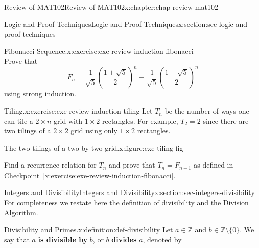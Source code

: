 \documentclass[oneside,10pt,]{book}
\newcommand{\xreffont}{\relax}
\newcommand{\terminology}[1]{\textbf{#1}}
\numberwithin{equation}{section}
\begin{document}
\begin{chapterptx}{Review of MAT102}{}{Review of MAT102}{}{}{x:chapter:chap-review-mat102}
\begin{sectionptx}{Logic and Proof Techniques}{}{Logic and Proof Techniques}{}{}{x:section:sec-logic-and-proof-techniques}
\begin{inlineexercise}{Fibonacci Sequence.}{x:exercise:exe-review-induction-fibonacci}
\begin{equation*}
\end{equation*}
Prove that%
\begin{equation*}
F_n = \frac{1}{\sqrt{5}}\left(\frac{1+\sqrt{5}}{2}\right)^n - \frac{1}{\sqrt{5}}\left(\frac{1-\sqrt{5}}{2}\right)^n
\end{equation*}
using strong induction.%
\end{inlineexercise}%
\begin{inlineexercise}{Tiling.}{x:exercise:exe-review-induction-tiling}%
Let \(T_n\) be the number of ways one can tile a \(2 \times n\) grid with \(1 \times 2\) rectangles. For example, \(T_2 = 2\) since there are two tilings of a \(2 \times 2\) grid using only \(1 \times 2\) rectangles.%
\begin{figureptx}{The two tilings of a two-by-two grid.}{x:figure:exe-tiling-fig}{}%
\begin{image}{0.25}{0.5}{0.25}%
%
\end{image}%
\tcblower
\end{figureptx}%
Find a recurrence relation for \(T_n\) and prove that \(T_n = F_{n+1}\) as defined in \hyperref[x:exercise:exe-review-induction-fibonacci]{Checkpoint~{\xreffont\ref{x:exercise:exe-review-induction-fibonacci}}}.%
\end{inlineexercise}%
\end{sectionptx}
%
%
\typeout{************************************************}
\typeout{************************************************}
%
\begin{sectionptx}{Integers and Divisibility}{}{Integers and Divisibility}{}{}{x:section:sec-integers-divisibility}
For completeness we restate here the definition of divisibility and the Division Algorithm.%
\begin{definition}{Divisibility and Primes.}{x:definition:def-divisibility}%
\label{g:notation:id521889} Let \(a \in \mathbb{Z}\) and \(b \in \mathbb{Z} \setminus \{0\}\). We say that \(a\) \terminology{is divisible by} \(b\), or \(b\) \terminology{divides} \(a\), denoted by%

\end{definition}
\end{sectionptx}
\end{chapterptx}
\end{document}
